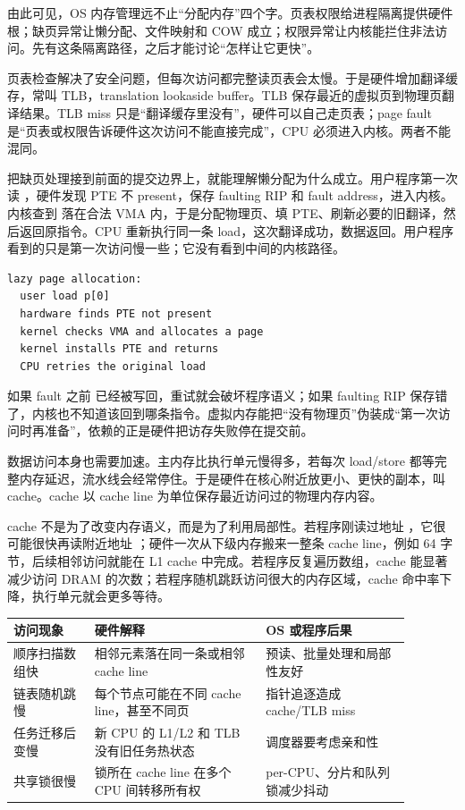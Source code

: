 由此可见，OS 内存管理远不止“分配内存”四个字。页表权限给进程隔离提供硬件根；缺页异常让懒分配、文件映射和 COW 成立；权限异常让内核能拦住非法访问。先有这条隔离路径，之后才能讨论“怎样让它更快”。

页表检查解决了安全问题，但每次访问都完整读页表会太慢。于是硬件增加翻译缓存，常叫 TLB，translation lookaside buffer。TLB 保存最近的虚拟页到物理页翻译结果。TLB miss 只是“翻译缓存里没有”，硬件可以自己走页表；page fault 是“页表或权限告诉硬件这次访问不能直接完成”，CPU 必须进入内核。两者不能混同。

把缺页处理接到前面的提交边界上，就能理解懒分配为什么成立。用户程序第一次读 ，硬件发现 PTE 不 present，保存 faulting RIP 和 fault address，进入内核。内核查到  落在合法 VMA 内，于是分配物理页、填 PTE、刷新必要的旧翻译，然后返回原指令。CPU 重新执行同一条 load，这次翻译成功，数据返回。用户程序看到的只是第一次访问慢一些；它没有看到中间的内核路径。

\begin{lstlisting}
lazy page allocation:
  user load p[0]
  hardware finds PTE not present
  kernel checks VMA and allocates a page
  kernel installs PTE and returns
  CPU retries the original load
\end{lstlisting}

如果 fault 之前  已经被写回，重试就会破坏程序语义；如果 faulting RIP 保存错了，内核也不知道该回到哪条指令。虚拟内存能把“没有物理页”伪装成“第一次访问时再准备”，依赖的正是硬件把访存失败停在提交前。

数据访问本身也需要加速。主内存比执行单元慢得多，若每次 load/store 都等完整内存延迟，流水线会经常停住。于是硬件在核心附近放更小、更快的副本，叫 cache。cache 以 cache line 为单位保存最近访问过的物理内存内容。

cache 不是为了改变内存语义，而是为了利用局部性。若程序刚读过地址 ，它很可能很快再读附近地址 ；硬件一次从下级内存搬来一整条 cache line，例如 64 字节，后续相邻访问就能在 L1 cache 中完成。若程序反复遍历数组，cache 能显著减少访问 DRAM 的次数；若程序随机跳跃访问很大的内存区域，cache 命中率下降，执行单元就会更多等待。

\begin{longtable}{p{0.18\linewidth}p{0.38\linewidth}p{0.32\linewidth}}
\toprule
访问现象 & 硬件解释 & OS 或程序后果 \\
\midrule
顺序扫描数组快 & 相邻元素落在同一条或相邻 cache line & 预读、批量处理和局部性友好 \\
链表随机跳慢 & 每个节点可能在不同 cache line，甚至不同页 & 指针追逐造成 cache/TLB miss \\
任务迁移后变慢 & 新 CPU 的 L1/L2 和 TLB 没有旧任务热状态 & 调度器要考虑亲和性 \\
共享锁很慢 & 锁所在 cache line 在多个 CPU 间转移所有权 & per-CPU、分片和队列锁减少抖动 \\
\bottomrule
\end{longtable}


